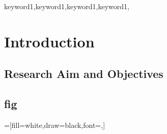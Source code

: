 \documentclass[
    writingLanguage=english, 
    addPageTitle=on,
    addDeclaration=on,
    addMUSTlog=off,
    printing=off,
    refIndent=on,
    addFigTOC=on,
    addTabTOC=on,
]{.def/must}
\begin{document}
\begin{abstract@en}{keyword1,keyword1,keyword1,keyword1,}

\the\baselineskip
\end{abstract@en}

\addtableofcontents


\chapter{Introduction}
\section{Research Aim and Objectives}
\section{fig}
\captionsetup[figure]{singlelinecheck=off,justification=raggedright}
\captionsetup[subfigure]{singlelinecheck=on}
=[fill=white,draw=black,font=\small,]
\end{document}
